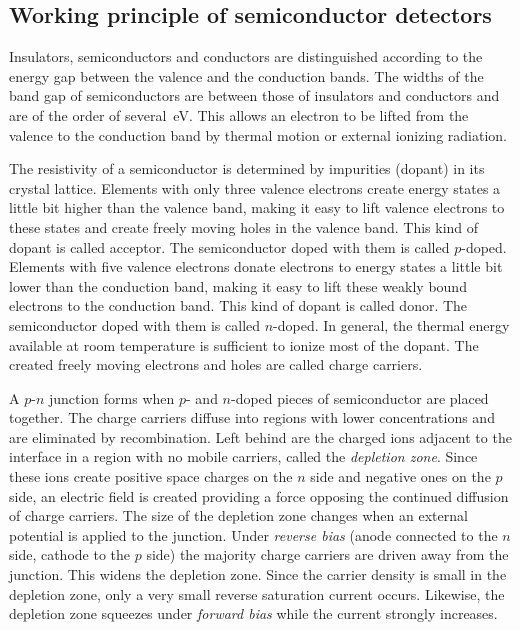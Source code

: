 \subsection{Working principle of semiconductor detectors}
\label{sec:det:prin}
Insulators, semiconductors and conductors are distinguished according
to the energy gap between the valence and the conduction bands. The
widths of the band gap of semiconductors are between those of
insulators and conductors and are of the order of several~eV. This
allows an electron to be lifted from the valence to the conduction
band by thermal motion or external ionizing radiation.

The resistivity of a semiconductor is determined by impurities
(dopant) in its crystal lattice. Elements with only three valence
electrons create energy states a little bit higher than the valence
band, making it easy to lift valence electrons to these states and
create freely moving holes in the valence band. This kind of dopant is
called acceptor. The semiconductor doped with them is called
$p$-doped. Elements with five valence electrons donate electrons to
energy states a little bit lower than the conduction band, making it
easy to lift these weakly bound electrons to the conduction band. This
kind of dopant is called donor. The semiconductor doped with them is
called $n$-doped. In general, the thermal energy available at room
temperature is sufficient to ionize most of the dopant. The created
freely moving electrons and holes are called charge carriers.

A $p$-$n$ junction forms when $p$- and $n$-doped pieces of
semiconductor are placed together. The charge carriers diffuse into
regions with lower concentrations and are eliminated by
recombination. Left behind are the charged ions adjacent to the
interface in a region with no mobile carriers, called the
\emph{depletion zone}. Since these ions create positive space charges
on the $n$ side and negative ones on the $p$ side, an electric field
is created providing a force opposing the continued diffusion of
charge carriers. The size of the depletion zone changes when an
external potential is applied to the junction. Under \emph{reverse
bias} (anode connected to the $n$ side, cathode to the $p$ side) the
majority charge carriers are driven away from the junction. This
widens the depletion zone. Since the carrier density is small in the
depletion zone, only a very small reverse saturation current
occurs. Likewise, the depletion zone squeezes under \emph{forward
bias} while the current strongly increases.

